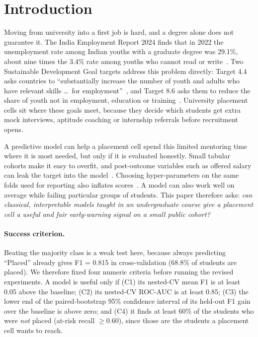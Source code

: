 \documentclass[runningheads]{llncs}
\begin{document}
\section{Introduction}
Moving from university into a first job is hard, and a degree alone does not guarantee it. The India Employment Report 2024 finds that in 2022 the unemployment rate among Indian youths with a graduate degree was 29.1\%, about nine times the 3.4\% rate among youths who cannot read or write~\cite{ilo}. Two Sustainable Development Goal targets address this problem directly: Target 4.4 asks countries to ``substantially increase the number of youth and adults who have relevant skills \dots\ for employment''~\cite{sdg44}, and Target 8.6 asks them to reduce the share of youth not in employment, education or training~\cite{sdg86}. University placement cells sit where these goals meet, because they decide which students get extra mock interviews, aptitude coaching or internship referrals before recruitment opens.

A predictive model can help a placement cell spend this limited mentoring time where it is most needed, but only if it is evaluated honestly. Small tabular cohorts make it easy to overfit, and post-outcome variables such as offered salary can leak the target into the model~\cite{kaufman}. Choosing hyper-parameters on the same folds used for reporting also inflates scores~\cite{varma,cawley}. A model can also work well on average while failing particular groups of students. This paper therefore asks: \emph{can classical, interpretable models taught in an undergraduate course give a placement cell a useful and fair early-warning signal on a small public cohort?}

\paragraph{Success criterion.} Beating the majority class is a weak test here, because always predicting ``Placed'' already gives F1 = 0.815 in cross-validation (68.8\% of students are placed). We therefore fixed four numeric criteria before running the revised experiments. A model is useful only if (C1) its nested-CV mean F1 is at least 0.05 above the baseline; (C2) its nested-CV ROC-AUC is at least 0.85; (C3) the lower end of the paired-bootstrap 95\% confidence interval of its held-out F1 gain over the baseline is above zero; and (C4) it finds at least 60\% of the students who were \emph{not} placed (at-risk recall $\geq 0.60$), since those are the students a placement cell wants to reach.
\end{document}
